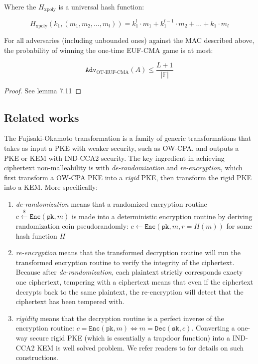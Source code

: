 \documentclass[floatrow,journal=tches,submission]{iacrtrans}
\newcommand{\encrypt}{\texttt{Enc}}
\newcommand{\decrypt}{\texttt{Dec}}
\newcommand{\pk}{\texttt{pk}}
\newcommand{\sk}{\texttt{sk}}
\newcommand{\leftsample}{\stackrel{\$}{\leftarrow}}
\newcommand{\norm}[1]{\left\lvert #1 \right\rvert}
\newcommand{\adv}{\texttt{Adv}}
\begin{document}
Where the $H_\text{xpoly}$ is a universal hash function:

\begin{equation*}
    H_\text{xpoly}(k_1, (m_1, m_2, \ldots, m_l)) = k_1^l \cdot m_1 + k_1^{l-1} \cdot m_2 + \ldots + k_1 \cdot m_l
\end{equation*}

\begin{lemma}
    For all adversaries (including unbounded ones) against the MAC described above, the probability of winning the one-time EUF-CMA game is at most:

    \begin{equation*}
        \adv_\text{OT-EUF-CMA}(A) \leq \frac{L+1}{\norm{\mathbb{F}}}
    \end{equation*}
\end{lemma}
\begin{proof}
    See \cite{boneh2020graduate} lemma 7.11
\end{proof}

\subsection{Related works}
The Fujisaki-Okamoto transformation \cite{fujisaki1999secure}\cite{hofheinz2017modular} is a family of generic transformations that takes as input a PKE with weaker security, such as OW-CPA, and outputs a PKE or KEM with IND-CCA2 security. The key ingredient in achieving ciphertext non-malleability is with \emph{de-randomization} and \emph{re-encryption}, which first transform a OW-CPA PKE into a \emph{rigid} PKE, then transform the rigid PKE into a KEM. More specifically: \begin{enumerate}
    \item \emph{de-randomization} means that a randomized encryption routine $c \leftsample \encrypt(\pk, m)$ is made into a deterministic encryption routine by deriving randomization coin pseudorandomly: $c \leftarrow \encrypt(\pk, m, r = H(m))$ for some hash function $H$
    \item \emph{re-encryption} means that the transformed decryption routine will run the transformed encryption routine to verify the integrity of the ciphertext. Because after \emph{de-randomization}, each plaintext strictly corresponds exacty one ciphertext, tempering with a ciphertext means that even if the ciphertext decrypts back to the same plaintext, the re-encryption will detect that the ciphertext has been tempered with.
    \item \emph{rigidity} means that the decryption routine is a perfect inverse of the encryption routine: $c = \encrypt(\pk, m) \Leftrightarrow m = \decrypt(\sk, c)$. Converting a one-way secure rigid PKE (which is essentially a trapdoor function) into a IND-CCA2 KEM is well solved problem. We refer readers to \cite{boneh2020graduate} for details on such constructions.
\end{enumerate}
\end{document}
